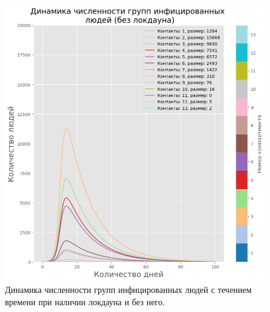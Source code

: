 \documentclass[14pt,a4paper]{article}
\begin{document}
\begin{figure}[h!]
\begin{minipage}{0.5\textwidth}
		\includegraphics[width=\linewidth]{img/sir_model_nonlockdown_urban_I_new.png}
	\end{minipage}
	\caption{Динамика численности групп инфицированных людей с течением времени при наличии локдауна и без него.}
	\label{fig:disease_spreading_loc_nonloc_I}
\end{figure}
\end{document}
